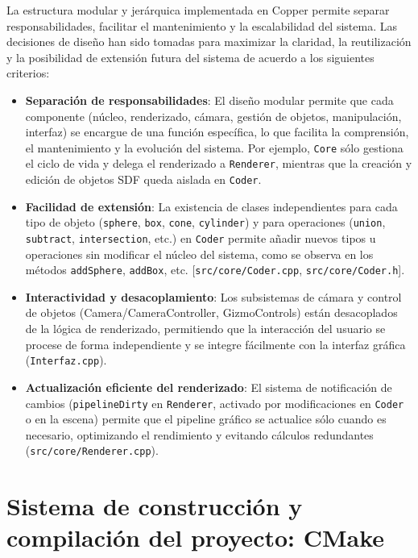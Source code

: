 La estructura modular y jerárquica implementada en Copper permite separar
responsabilidades, facilitar el mantenimiento y la escalabilidad del sistema.
Las decisiones de diseño han sido tomadas para maximizar la claridad, la
reutilización y la posibilidad de extensión futura del sistema de acuerdo a los
siguientes criterios:

\begin{itemize}
    \item \textbf{Separación de responsabilidades}: El diseño modular permite que cada componente (núcleo, renderizado, cámara, gestión de objetos, manipulación, interfaz) se encargue de una función específica, lo que facilita la comprensión, el mantenimiento y la evolución del sistema. Por ejemplo, \texttt{Core} sólo gestiona el ciclo de vida y delega el renderizado a \texttt{Renderer}, mientras que la creación y edición de objetos SDF queda aislada en \texttt{Coder}.
    \item \textbf{Facilidad de extensión}: La existencia de clases independientes para cada tipo de objeto (\texttt{sphere}, \texttt{box}, \texttt{cone}, \texttt{cylinder}) y para operaciones (\texttt{union}, \texttt{subtract}, \texttt{intersection}, etc.) en \texttt{Coder} permite añadir nuevos tipos u operaciones sin modificar el núcleo del sistema, como se observa en los métodos \texttt{addSphere}, \texttt{addBox}, etc. [\texttt{src/core/Coder.cpp}, \texttt{src/core/Coder.h}].
    \item \textbf{Interactividad y desacoplamiento}: Los subsistemas de cámara y control de objetos (Camera/CameraController, GizmoControls) están desacoplados de la lógica de renderizado, permitiendo que la interacción del usuario se procese de forma independiente y se integre fácilmente con la interfaz gráfica (\texttt{Interfaz.cpp}).
    \item \textbf{Actualización eficiente del renderizado}: El sistema de notificación de cambios (\texttt{pipelineDirty} en \texttt{Renderer}, activado por modificaciones en \texttt{Coder} o en la escena) permite que el pipeline gráfico se actualice sólo cuando es necesario, optimizando el rendimiento y evitando cálculos redundantes (\texttt{src/core/Renderer.cpp}).
\end{itemize}

\section{Sistema de construcción y compilación del proyecto: CMake}

